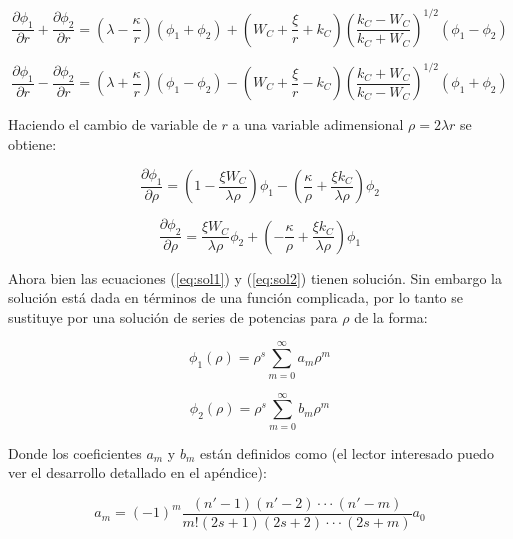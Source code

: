 \documentclass[a4paper, 12pt]{article} %
\begin{document}
\begin{equation}\label{eq:phi1-1}
\dfrac{\partial \phi_1}{\partial r} + \dfrac{\partial \phi_2}{\partial r}
= \left( \lambda - \dfrac{\kappa}{r} \right)(\phi_1 + \phi_2) 
+ \left ( W_C + \dfrac{\xi}{r} + k_C \right) 
\left(\dfrac{k_C - W_C }{k_C + W_C} \right)^{1/2} (\phi_1 - \phi_2)
\end{equation}

\begin{equation}\label{eq:phi2-1}
\dfrac{\partial \phi_1}{\partial r} - \dfrac{\partial \phi_2}{\partial r}
= \left( \lambda + \dfrac{\kappa}{r} \right)(\phi_1 - \phi_2) 
- \left ( W_C + \dfrac{\xi}{r} - k_C \right) 
\left(\dfrac{k_C + W_C }{k_C - W_C} \right)^{1/2} (\phi_1 + \phi_2)
\end{equation}

Haciendo el cambio de variable de $r$ a una variable adimensional $\rho = 2 \lambda r$
se obtiene:

\begin{equation}\label{eq:sol1}
\dfrac{\partial \phi_1}{\partial \rho} = \left( 1-\dfrac{\xi W_C}{\lambda  \rho} \right) 
\phi_1 - \left( \dfrac{\kappa}{\rho} + \dfrac{\xi k_C}{\lambda \rho}  \right)\phi_2
\end{equation}

\begin{equation}\label{eq:sol2}
\dfrac{\partial \phi_2}{\partial \rho} = \dfrac{\xi W_C}{\lambda  \rho} \phi_2 
+ \left( -\dfrac{\kappa}{\rho} + \dfrac{\xi k_C}{\lambda \rho}  \right)\phi_1
\end{equation}

Ahora bien las ecuaciones (\ref{eq:sol1}) y (\ref{eq:sol2}) tienen soluci\'on. 
Sin embargo la soluci\'on est\'a dada en t\'erminos de una funci\'on complicada, 
por lo tanto se sustituye por una soluci\'on de series de potencias para 
$\rho$ de la forma:

\begin{equation}\label{eq:phi1}
\phi_1(\rho) = \rho^s \sum \limits_{m=0}^{\infty} a_m \rho^m
\end{equation}


\begin{equation} \label{eq:phi2}
\phi_2(\rho) = \rho^s \sum \limits_{m=0}^{\infty} b_m \rho^m
\end{equation}

Donde los coeficientes $a_m$ y $b_m$ est\'an definidos como (el lector interesado 
puedo ver el desarrollo detallado en el ap\'endice):

\begin{equation}
a_m = (-1)^m \dfrac{(n'-1)(n'-2)\cdot\cdot\cdot(n'-m)}{m!(2s+1)(2s+2)\cdot\cdot\cdot(2s+m)}a_0
\end{equation}
\end{document}
